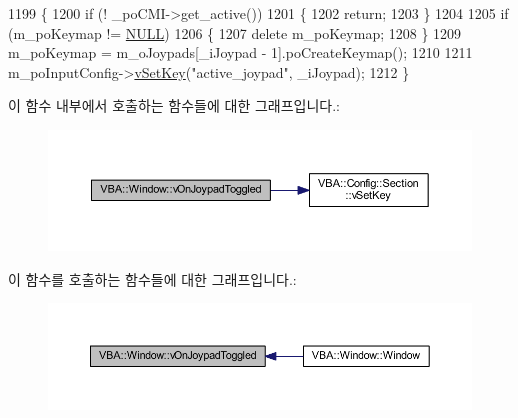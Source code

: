 \begin{DoxyCode}
1199 \{
1200   \textcolor{keywordflow}{if} (! \_poCMI->get\_active())
1201   \{
1202     \textcolor{keywordflow}{return};
1203   \}
1204 
1205   \textcolor{keywordflow}{if} (m\_poKeymap != \mbox{\hyperlink{getopt1_8c_a070d2ce7b6bb7e5c05602aa8c308d0c4}{NULL}})
1206   \{
1207     \textcolor{keyword}{delete} m\_poKeymap;
1208   \}
1209   m\_poKeymap = m\_oJoypads[\_iJoypad - 1].poCreateKeymap();
1210 
1211   m\_poInputConfig->\mbox{\hyperlink{class_v_b_a_1_1_config_1_1_section_a57e1b95cbea40db71c093381beff4b0e}{vSetKey}}(\textcolor{stringliteral}{"active\_joypad"}, \_iJoypad);
1212 \}
\end{DoxyCode}
이 함수 내부에서 호출하는 함수들에 대한 그래프입니다.\+:
\nopagebreak
\begin{figure}[H]
\begin{center}
\leavevmode
\includegraphics[width=350pt]{class_v_b_a_1_1_window_a38491fe3a0daf6be7ab610fd282d2e47_cgraph}
\end{center}
\end{figure}
이 함수를 호출하는 함수들에 대한 그래프입니다.\+:
\nopagebreak
\begin{figure}[H]
\begin{center}
\leavevmode
\includegraphics[width=350pt]{class_v_b_a_1_1_window_a38491fe3a0daf6be7ab610fd282d2e47_icgraph}
\end{center}
\end{figure}
\mbox{\label{class_v_b_a_1_1_window_aabcf3fafc945b040ac1f775cb32a7245}} 
